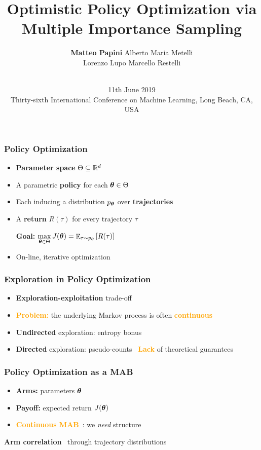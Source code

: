 \documentclass[aspectratio=169, table]{beamer}
\title{Optimistic Policy Optimization via Multiple Importance Sampling}
\date[AAA]{\vspace{0.2cm} \\ \small{ 11th June 2019 \\ Thirty-sixth International Conference on Machine Learning, Long Beach, CA, {USA}}}
\author[M. Papini]{\textbf{Matteo Papini} \quad Alberto Maria Metelli\\
						\small{Lorenzo Lupo \quad Marcello Restelli}}
\newcommand{\enb}[1]{\textcolor{poliblue1}{\textbf{#1}}}
\newcommand{\eno}[1]{\textcolor{orange}{\textbf{#1}}}
\begin{document}

\begin{frame}
\titlepage
\end{frame}

\begin{frame} 
\frametitle{Policy Optimization} 
\begin{itemize}
	\item \enb{Parameter space} $\Theta \subseteq \mathbb{R}^d$
	\item A parametric \enb{policy} for each $\boldsymbol{\theta}\in\Theta$
	\item Each inducing a distribution $p_{\boldsymbol{\theta}}$ over \enb{trajectories}
	\item A \enb{return} $R(\tau)$ for every trajectory $\tau$
	\vfill
	\begin{center}
	\Large \enb{Goal:} $\max\limits_{\boldsymbol{\theta}\in\Theta} J(\boldsymbol{\theta}) = \mathop{\mathbb{E}}_{\tau\sim p_{\boldsymbol{\theta}}}\left[R(\tau)\right]$
	\end{center}
	\vfill
	\item On-line, iterative optimization
\end{itemize}
\end{frame}

\begin{frame} 
\frametitle{Exploration in Policy Optimization} 
\begin{itemize}
	\item \enb{Exploration-exploitation} trade-off
	\item \eno{Problem:} the underlying Markov process is often \eno{continuous}
	\item \enb{Undirected} exploration: entropy bonus~\citep{haarnoja2018soft}
	\item \enb{Directed} exploration: pseudo-counts~\citep{bellemare2016unifying}
	\vfill
	\centering
	{\Large\eno{Lack} of theoretical guarantees}
\end{itemize}
\end{frame}

\begin{frame} 
\frametitle{Policy Optimization as a MAB } 
\begin{itemize}
	\item \enb{Arms:} parameters $\boldsymbol{\theta}$
	\item \enb{Payoff:} expected return $J(\boldsymbol{\theta})$
	\item \eno{Continuous MAB}~\citep{kleinberg2013bandits}: we \emph{need} structure
\end{itemize}
\vfill
\centering
{\Large\enb{Arm correlation}~\citep{pandey2007multi} through trajectory distributions}

\end{frame}
\end{document}

